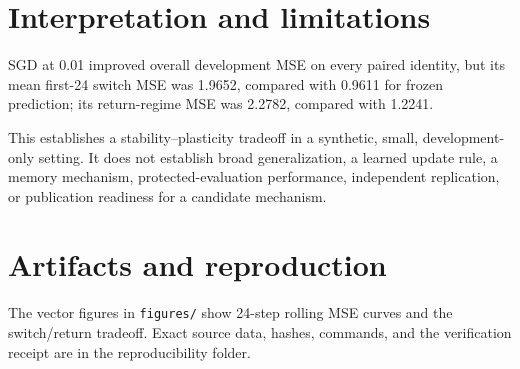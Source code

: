 \documentclass[11pt]{article}
\begin{document}
\section{Interpretation and limitations}

SGD at 0.01 improved overall development MSE on every paired identity, but its mean first-24 switch MSE was 1.9652, compared with 0.9611 for frozen prediction; its return-regime MSE was 2.2782, compared with 1.2241.

This establishes a stability--plasticity tradeoff in a synthetic, small, development-only setting. It does not establish broad generalization, a learned update rule, a memory mechanism, protected-evaluation performance, independent replication, or publication readiness for a candidate mechanism.

\section{Artifacts and reproduction}

The vector figures in \texttt{figures/} show 24-step rolling MSE curves and the switch/return tradeoff. Exact source data, hashes, commands, and the verification receipt are in the reproducibility folder.
\end{document}
